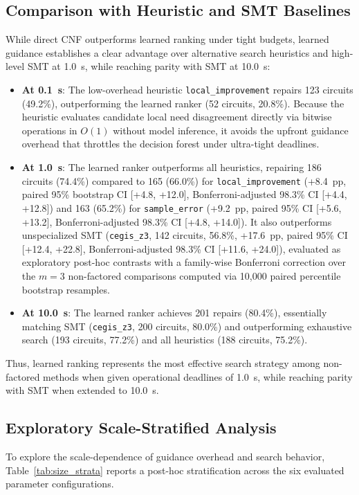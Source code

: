 \documentclass[11pt]{article}
\begin{document}
\subsection{Comparison with Heuristic and SMT Baselines}
While direct CNF outperforms learned ranking under tight budgets, learned guidance establishes a clear advantage over alternative search heuristics and high-level SMT at 1.0~s, while reaching parity with SMT at 10.0~s:
\begin{itemize}
    \item \textbf{At 0.1~s}: The low-overhead heuristic \texttt{local\_improvement} repairs 123 circuits (49.2\%), outperforming the learned ranker (52 circuits, 20.8\%). Because the heuristic evaluates candidate local need disagreement directly via bitwise operations in $O(1)$ without model inference, it avoids the upfront guidance overhead that throttles the decision forest under ultra-tight deadlines.
    \item \textbf{At 1.0~s}: The learned ranker outperforms all heuristics, repairing 186 circuits (74.4\%) compared to 165 (66.0\%) for \texttt{local\_improvement} (+8.4~pp, paired 95\% bootstrap CI [+4.8, +12.0], Bonferroni-adjusted 98.3\% CI [+4.4, +12.8]) and 163 (65.2\%) for \texttt{sample\_error} (+9.2~pp, paired 95\% CI [+5.6, +13.2], Bonferroni-adjusted 98.3\% CI [+4.8, +14.0]). It also outperforms unspecialized SMT (\texttt{cegis\_z3}, 142 circuits, 56.8\%, +17.6~pp, paired 95\% CI [+12.4, +22.8], Bonferroni-adjusted 98.3\% CI [+11.6, +24.0]), evaluated as exploratory post-hoc contrasts with a family-wise Bonferroni correction over the $m=3$ non-factored comparisons computed via 10,000 paired percentile bootstrap resamples.
    \item \textbf{At 10.0~s}: The learned ranker achieves 201 repairs (80.4\%), essentially matching SMT (\texttt{cegis\_z3}, 200 circuits, 80.0\%) and outperforming exhaustive search (193 circuits, 77.2\%) and all heuristics (188 circuits, 75.2\%).
\end{itemize}
Thus, learned ranking represents the most effective search strategy among non-factored methods when given operational deadlines of 1.0~s, while reaching parity with SMT when extended to 10.0~s.

\subsection{Exploratory Scale-Stratified Analysis}
To explore the scale-dependence of guidance overhead and search behavior, Table~\ref{tab:size_strata} reports a post-hoc stratification across the six evaluated parameter configurations.
\end{document}
